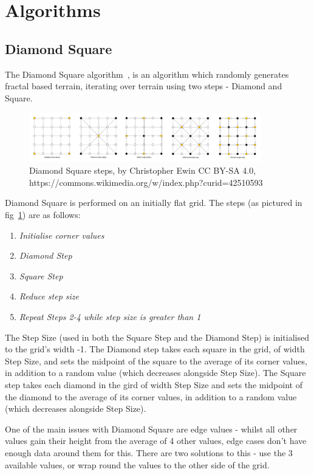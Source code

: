 \documentclass[a4paper,10pt]{report}
\begin{document}
\section{Algorithms}
\subsection{Diamond Square}
The Diamond Square algorithm~\cite{miller1986definition}, is an algorithm which randomly generates fractal based terrain, iterating over terrain using two steps - Diamond and Square. \medskip 

\begin{figure}[h!]
    \centering
  \includegraphics[width=0.9\textwidth]{Diamond_Square}
 \caption{Diamond Square steps, by Christopher Ewin CC BY-SA 4.0, https://commons.wikimedia.org/w/index.php?curid=42510593}
 \label{fig:diamond_square_steps}
\end{figure} 

Diamond Square is performed on an initially flat grid. The steps (as pictured in fig~\ref{fig:diamond_square_steps}) are as follows:

\begin{enumerate}
\item \textit{Initialise corner values}
\item \textit{Diamond Step}
\item \textit{Square Step}
\item \textit{Reduce step size} 
\item \textit{Repeat Steps 2-4 while step size is greater than 1}
\end{enumerate} 

The Step Size (used in both the Square Step and the Diamond Step) is initialised to the grid's width -1. The Diamond step takes each square in the grid, of width Step Size, and sets the midpoint of the square to the average of its corner values, in addition to a random value (which decreases alongside Step Size). The Square step takes each diamond in the gird of width Step Size and sets the midpoint of the diamond to the average of its corner values, in addition to a random value (which decreases alongside Step Size). \medskip

One of the main issues with Diamond Square are edge values - whilst all other values gain their height from the average of 4 other values, edge cases don't have enough data around them for this. There are two solutions to this - use the 3 available values, or wrap round the values to the other side of the grid. 
\end{document}
